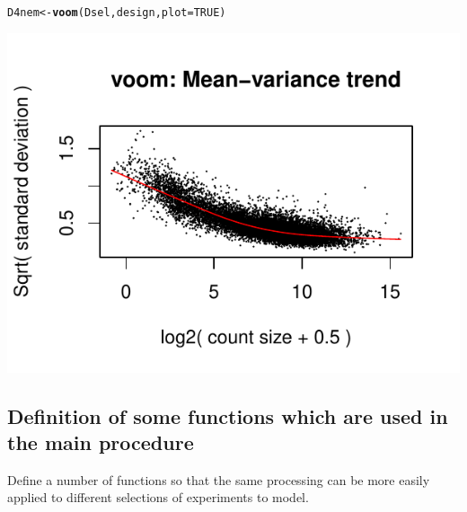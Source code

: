 \documentclass[a4paper]{article}\usepackage[]{graphicx}\usepackage[]{color}
\makeatletter
\def\maxwidth{ %
  \ifdim\Gin@nat@width>\linewidth
    \linewidth
  \else
    \Gin@nat@width
  \fi
}
\newcommand{\hlnum}[1]{\textcolor[rgb]{0.686,0.059,0.569}{#1}}%
\newcommand{\hlstd}[1]{\textcolor[rgb]{0.345,0.345,0.345}{#1}}%
\newcommand{\hlkwb}[1]{\textcolor[rgb]{0.69,0.353,0.396}{#1}}%
\newcommand{\hlkwc}[1]{\textcolor[rgb]{0.333,0.667,0.333}{#1}}%
\newcommand{\hlkwd}[1]{\textcolor[rgb]{0.737,0.353,0.396}{\textbf{#1}}}%
\newenvironment{kframe}{%
 \def\at@end@of@kframe{}%
 \ifinner\ifhmode%
  \def\at@end@of@kframe{\end{minipage}}%
  \begin{minipage}{\columnwidth}%
 \fi\fi%
 \def\FrameCommand##1{\hskip\@totalleftmargin \hskip-\fboxsep
 \colorbox{shadecolor}{##1}\hskip-\fboxsep
     \hskip-\linewidth \hskip-\@totalleftmargin \hskip\columnwidth}%
 \MakeFramed {\advance\hsize-\width
   \@totalleftmargin\z@ \linewidth\hsize
   \@setminipage}}%
 {\par\unskip\endMakeFramed%
 \at@end@of@kframe}
\newenvironment{knitrout}{}{} %
\makeatother
\begin{document}
\begin{knitrout}
\color{fgcolor}\begin{kframe}
\begin{alltt}
\hlstd{D4nem} \hlkwb{<-} \hlkwd{voom}\hlstd{(Dsel, design,} \hlkwc{plot} \hlstd{=} \hlnum{TRUE}\hlstd{)}
\end{alltt}
\end{kframe}
\includegraphics[width=\maxwidth]{figure/voomTransform} 

\end{knitrout}


\subsection*{Definition of some functions which are used in the main procedure}
Define a number of functions so that the same processing can be more easily applied to different selections of experiments to model.
\end{document}
